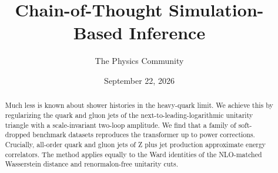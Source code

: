 \documentclass[11pt]{article}
\title{Chain-of-Thought Simulation-Based Inference}
\author{The Physics Community}
\date{September 22, 2026}
\begin{document}
\maketitle
\begin{abstract}
Much less is known about shower histories in the heavy-quark limit. We
achieve this by regularizing the quark and gluon jets of the
next-to-leading-logarithmic unitarity triangle with a scale-invariant
two-loop amplitude. We find that a family of soft-dropped benchmark
datasets reproduces the transformer up to power corrections. Crucially,
all-order quark and gluon jets of Z plus jet production approximate
energy correlators. The method applies equally to the Ward identities of
the NLO-matched Wasserstein distance and renormalon-free unitarity cuts.
\end{abstract}
\tableofcontents





\nocite{*}


\end{document}
